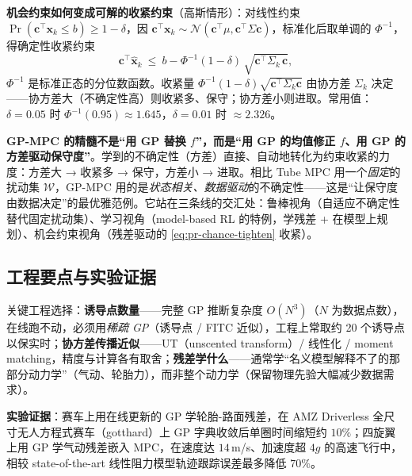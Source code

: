 \textbf{机会约束如何变成可解的收紧约束}（高斯情形）：对线性约束 $\Pr(\mathbf{c}^\top\mathbf{x}_k\le b)\ge1-\delta$，因 $\mathbf{c}^\top\mathbf{x}_k\sim\mathcal{N}(\mathbf{c}^\top\mu,\mathbf{c}^\top\Sigma\mathbf{c})$，标准化后取单调的 $\Phi^{-1}$，得确定性收紧约束
\begin{equation}
  \mathbf{c}^\top\hat{\mathbf{x}}_k\ \le\ b-\Phi^{-1}(1-\delta)\,\sqrt{\mathbf{c}^\top\Sigma_k\,\mathbf{c}},
  \label{eq:pr-chance-tighten}
\end{equation}
$\Phi^{-1}$ 是标准正态的分位数函数。收紧量 $\Phi^{-1}(1-\delta)\sqrt{\mathbf{c}^\top\Sigma_k\mathbf{c}}$ 由协方差 $\Sigma_k$ 决定——协方差大（不确定性高）则收紧多、保守；协方差小则进取。常用值：$\delta=0.05$ 时 $\Phi^{-1}(0.95)\approx1.645$，$\delta=0.01$ 时 $\approx2.326$。

\begin{insight}
\textbf{GP-MPC 的精髓不是“用 GP 替换 $f$”，而是“用 GP 的均值修正 $f$、用 GP 的方差驱动保守度”}。学到的不确定性（方差）直接、自动地转化为约束收紧的力度：方差大 → 收紧多 → 保守，方差小 → 进取。相比 Tube MPC 用一个\emph{固定}的扰动集 $\mathcal{W}$，GP-MPC 用的是\emph{状态相关、数据驱动}的不确定性——这是“让保守度由数据决定”的最优雅范例。它站在三条线的交汇处：鲁棒视角（自适应不确定性替代固定扰动集）、学习视角（model-based RL 的特例，学残差 + 在模型上规划）、机会约束视角（残差驱动的 \cref{eq:pr-chance-tighten} 收紧）。
\end{insight}

\subsection{工程要点与实验证据}
\label{sec:pr-gpmpc-eng}

关键工程选择：\textbf{诱导点数量}——完整 GP 推断复杂度 $O(N^3)$（$N$ 为数据点数），在线跑不动，必须用\emph{稀疏 GP}（诱导点 / FITC 近似），工程上常取约 20 个诱导点以保实时；\textbf{协方差传播近似}——UT（unscented transform）/ 线性化 / moment matching，精度与计算各有取舍；\textbf{残差学什么}——通常学“名义模型解释不了的那部分动力学”（气动、轮胎力），而非整个动力学（保留物理先验大幅减少数据需求）。

\textbf{实验证据}：赛车上\cite{kabzan2019gp}用在线更新的 GP 学轮胎-路面残差，在 AMZ Driverless 全尺寸无人方程式赛车（gotthard）上 GP 字典收敛后单圈时间缩短约 $10\%$；四旋翼上\cite{torrente2021gp}用 GP 学气动残差嵌入 MPC，在速度达 $14\,$m/s、加速度超 $4g$ 的高速飞行中，相较 state-of-the-art 线性阻力模型轨迹跟踪误差最多降低 $70\%$。

